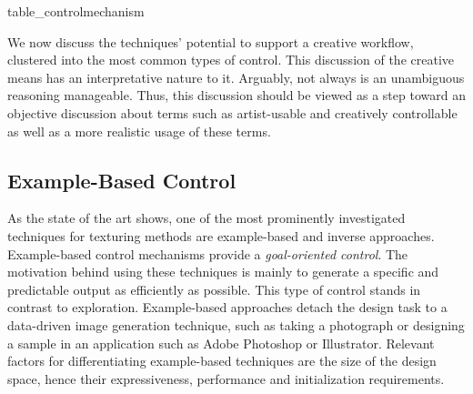 {table_controlmechanism}


We now discuss the techniques' potential to support a creative workflow, clustered into the most common types of control. This discussion of the creative means has an interpretative nature to it. Arguably, not always is an unambiguous reasoning manageable. Thus, this discussion should be viewed as a step toward an objective discussion about terms such as artist-usable and creatively controllable as well as a more realistic usage of these terms.

\subsection{Example-Based Control}
\label{subsubsec:analysis_creative_means_example}

As the state of the art shows, one of the most prominently investigated techniques for texturing methods are example-based and inverse approaches. Example-based control mechanisms provide a \textit{goal-oriented control}. The motivation behind using these techniques is mainly to generate a specific and predictable output as efficiently as possible. This type of control stands in contrast to exploration. Example-based approaches detach the design task to a data-driven image generation technique, such as taking a photograph or designing a sample in an application such as Adobe Photoshop or Illustrator. Relevant factors for differentiating example-based techniques are the size of the design space, hence their expressiveness, performance and initialization requirements. 

